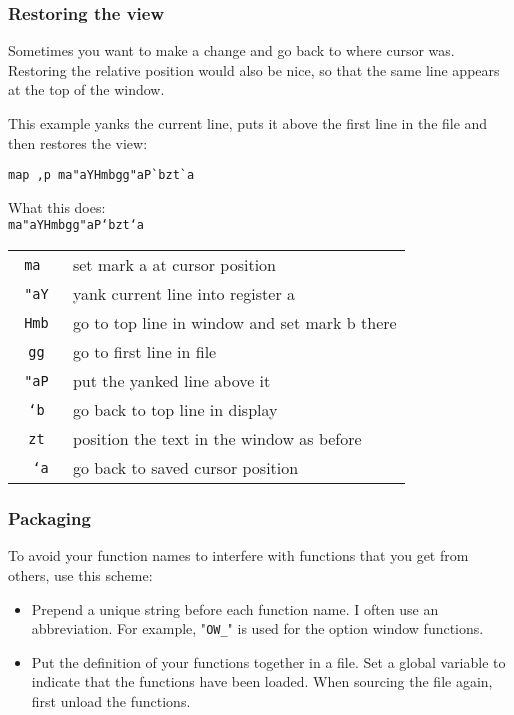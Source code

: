 \subsubsection{Restoring the view}
Sometimes you want to make a change and go back to where cursor was.
Restoring the relative position would also be nice, so that the same line appears at the top of the window.

This example yanks the current line, puts it above the first line in the file and then restores the view:

\begin{Verbatim}[samepage=true]
 map ,p ma"aYHmbgg"aP`bzt`a
\end{Verbatim}

What this does:\\
\texttt{ma"aYHmbgg"aP`bzt`a}
\begin{center} \begin{tabular}{c l} %
\texttt{ma                 } & set mark a at cursor position \\
\texttt{  "aY              } & yank current line into register a \\
\texttt{     Hmb           } & go to top line in window and set mark b there \\
\texttt{        gg         } & go to first line in file \\
\texttt{          "aP      } & put the yanked line above it \\
\texttt{             `b    } & go back to top line in display \\
\texttt{               zt  } & position the text in the window as before \\
\texttt{                 `a} & go back to saved cursor position \\
\end{tabular} \end{center}

\subsubsection{Packaging}
To avoid your function names to interfere with functions that you get from others, use this scheme:
\begin{itemize} 
				\item Prepend a unique string before each function name.
								I often use an abbreviation.
								For example, "\texttt{OW\_}" is used for the option window functions.
				\item Put the definition of your functions together in a file.
								Set a global variable to indicate that the functions have been loaded.
								When sourcing the file again, first unload the functions.
\end{itemize}

